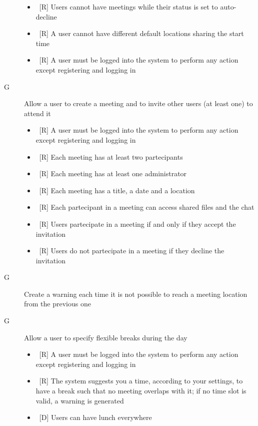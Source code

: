\begin{description}
\begin{itemize}
\item~[R] Users cannot have meetings while their status is set to auto-decline
\item~[R] A user cannot have different default locations sharing the start time
\item~[R] A user must be logged into the system to perform any action except registering and logging in
\end{itemize}

\item[G\thecountReq] Allow a user to create a meeting and to invite other users (at least one) to attend it

\begin{itemize}
\item~[R] A user must be logged into the system to perform any action except registering and logging in
\item~[R] Each meeting has at least two partecipants
\item~[R] Each meeting has at least one administrator
\item~[R] Each meeting has a title, a date and a location
\item~[R] Each partecipant in a meeting can access shared files and the chat
\item~[R] Users partecipate in a meeting if and only if they accept the invitation
\item~[R] Users do not partecipate in a meeting if they decline the invitation
\end{itemize}

\item[G\thecountReq] Create a warning each time it is not possible to reach a meeting location from the previous one

\item[G\thecountReq] Allow a user to specify flexible breaks during the day

\begin{itemize}
\item~[R] A user must be logged into the system to perform any action except registering and logging in
\item~[R] The system suggests you a time, according to your settings, to have a break such that no meeting overlaps with it; if no time slot is valid, a warning is generated
\end{itemize}

\begin{itemize}
\item~[D] Users can have lunch everywhere
\end{itemize}


\end{description}
